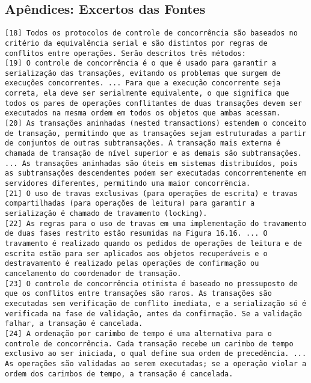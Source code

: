 \documentclass[12pt, a4paper]{article}
\begin{document}
\newpage
\begin{appendix}
\section{Apêndices: Excertos das Fontes}

\begin{Verbatim}[frame=single, label={Excertos da Fonte: Sistemas Distribuídos, 5ª Edição (Coulouris et al.)}]
[18] Todos os protocolos de controle de concorrência são baseados no critério da equivalência serial e são distintos por regras de conflitos entre operações. Serão descritos três métodos:
[19] O controle de concorrência é o que é usado para garantir a serialização das transações, evitando os problemas que surgem de execuções concorrentes. ... Para que a execução concorrente seja correta, ela deve ser serialmente equivalente, o que significa que todos os pares de operações conflitantes de duas transações devem ser executados na mesma ordem em todos os objetos que ambas acessam.
[20] As transações aninhadas (nested transactions) estendem o conceito de transação, permitindo que as transações sejam estruturadas a partir de conjuntos de outras subtransações. A transação mais externa é chamada de transação de nível superior e as demais são subtransações. ... As transações aninhadas são úteis em sistemas distribuídos, pois as subtransações descendentes podem ser executadas concorrentemente em servidores diferentes, permitindo uma maior concorrência.
[21] O uso de travas exclusivas (para operações de escrita) e travas compartilhadas (para operações de leitura) para garantir a serialização é chamado de travamento (locking).
[22] As regras para o uso de travas em uma implementação do travamento de duas fases restrito estão resumidas na Figura 16.16. ... O travamento é realizado quando os pedidos de operações de leitura e de escrita estão para ser aplicados aos objetos recuperáveis e o destravamento é realizado pelas operações de confirmação ou cancelamento do coordenador de transação.
[23] O controle de concorrência otimista é baseado no pressuposto de que os conflitos entre transações são raros. As transações são executadas sem verificação de conflito imediata, e a serialização só é verificada na fase de validação, antes da confirmação. Se a validação falhar, a transação é cancelada.
[24] A ordenação por carimbo de tempo é uma alternativa para o controle de concorrência. Cada transação recebe um carimbo de tempo exclusivo ao ser iniciada, o qual define sua ordem de precedência. ... As operações são validadas ao serem executadas; se a operação violar a ordem dos carimbos de tempo, a transação é cancelada.

\end{Verbatim}
\end{appendix}
\end{document}
